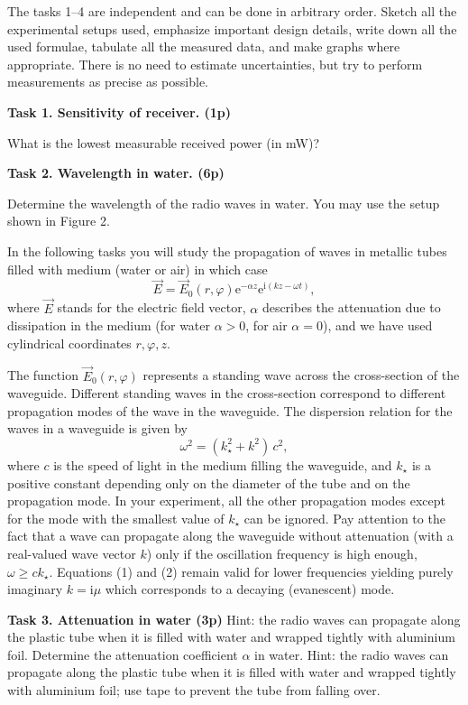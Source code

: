 The tasks 1--4 are independent and can be done in arbitrary order. Sketch all the experimental setups used, emphasize important design details, write down all the used formulae, tabulate all the measured data, and make graphs where appropriate. There is no need to estimate uncertainties, but try to perform measurements as precise as possible.

\textbf{Task 1. Sensitivity of receiver. (1p)}

What is the lowest measurable received power (in mW)?

\textbf{Task 2. Wavelength in water. (6p)}

Determine the wavelength of the radio waves in water. You may use the setup shown in Figure 2.

In the following tasks you will study the propagation of waves in metallic tubes filled with medium (water or air) in which case
\begin{equation}
\vec{E}=\vec{E}_0(r,\varphi)\mathrm{e}^{-\alpha z}\mathrm{e}^{\mathrm{i}(kz-\omega t)},
\tag{1}
\end{equation}
where $\vec{E}$ stands for the electric field vector, $\alpha$ describes the attenuation due to dissipation in the medium (for water $\alpha>0$, for air $\alpha=0$), and we have used cylindrical coordinates $r,\varphi,z$.

The function $\vec{E}_0(r,\varphi)$ represents a standing wave across the cross-section of the waveguide. Different standing waves in the cross-section correspond to different propagation modes of the wave in the waveguide. The dispersion relation for the waves in a waveguide is given by
\begin{equation}
\omega^2=(k_\star^2+k^2)\,c^2,
\tag{2}
\end{equation}
where $c$ is the speed of light in the medium filling the waveguide, and $k_\star$ is a positive constant depending only on the diameter of the tube and on the propagation mode. In your experiment, all the other propagation modes except for the mode with the smallest value of $k_\star$ can be ignored. Pay attention to the fact that a wave can propagate along the waveguide without attenuation (with a real-valued wave vector $k$) only if the oscillation frequency is high enough, $\omega\geq ck_\star$. Equations (1) and (2) remain valid for lower frequencies yielding purely imaginary $k=\mathrm{i}\mu$ which corresponds to a decaying (evanescent) mode.

\textbf{Task 3. Attenuation in water (3p)} Hint: the radio waves can propagate along the plastic tube when it is filled with water and wrapped tightly with aluminium foil. Determine the attenuation coefficient $\alpha$ in water. Hint: the radio waves can propagate along the plastic tube when it is filled with water and wrapped tightly with aluminium foil; use tape to prevent the tube from falling over.

